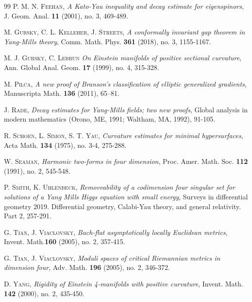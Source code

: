 \documentclass[12pt]{amsart} %
\theoremstyle{definition}
\numberwithin{equation}{section}
\begin{document}
\begin{thebibliography}{99}
 \textsc{P. M. N. Feehan}, \emph{A Kato-Yau inequality and decay estimate
for eigenspinors}, J. Geom. Anal. {\bf 11} (2001), no. 3, 469-489.

 \textsc{M. Gursky, C. L. Kelleher, J. Streets}, \emph{A conformally
invariant gap theorem in Yang-Mills theory}, Comm. Math. Phys. {\bf 361}
(2018), no. 3, 1155-1167.

 \textsc{M. J. Gursky, C. Lebrun} \emph{On Einstein manifolds of
positive sectional curvature}, Ann. Global Anal. Geom. {\bf 17} (1999), no.
4, 315-328.

 \textsc{M. Pilca}, \emph{A new proof of Branson's classification of elliptic generalized gradients},
Manuscripta Math. {\bf 136} (2011),  65–81.

 \textsc{J. Rade}, \emph{ Decay estimates for Yang-Mills fields; two
new proofs}, Global analysis in modern mathematics (Orono, ME, 1991;
Waltham, MA, 1992), 91-105.

 \textsc{R. Schoen, L. Simon, S. T. Yau}, \emph{Curvature estimates
for minimal hypersurfaces}, Acta Math. {\bf 134} (1975), no. 3-4, 275-288.

 \textsc{W. Seaman}, \emph{Harmonic two-forms in four dimension},
Proc. Amer. Math. Soc. {\bf 112} (1991), no. 2, 545-548.

 \textsc{P. Smith, K. Uhlenbeck}, \emph{Removeability of a codimension
four singular set for solutions of a Yang Mills Higgs equation with
small energy}, Surveys in differential geometry 2019. Differential
geometry, Calabi-Yau theory, and general relativity. Part 2, 257-291.

 \textsc{G. Tian, J. Viaclovsky},\emph{ Bach-flat asymptotically
locally Euclidean metrics}, Invent. Math.{\bf 160} (2005), no. 2, 357-415.

 \textsc{G. Tian, J. Viaclovsky}, \emph{Moduli spaces of critical
Riemannian metrics in dimension four}, Adv. Math. {\bf 196} (2005), no. 2,
346-372.

\textsc{D. Yang}, \emph{Rigidity of Einstein 4-manifolds with positive
curvature}, Invent. Math. {\bf 142} (2000), no. 2, 435-450.
\end{thebibliography}
\vspace{0.3cm}
\end{document}
